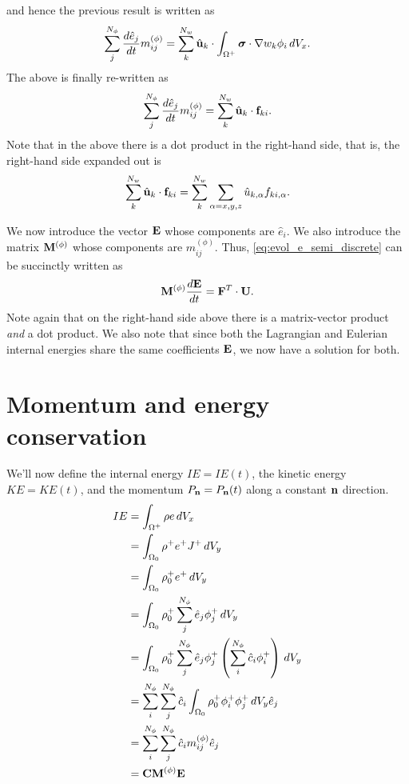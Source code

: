 \documentclass[11pt]{report}
\begin{document}
and hence the previous result is written as
\begin{equation}
    \sum_j^{N_\phi} \frac{d \hat{e}_j}{dt} m_{ij}^{(\phi)} = \sum_k^{N_w} \hat{\mathbf{u}}_k \cdot \int_{\Omega^+} \bm \sigma \cdot \nabla w_k \phi_i \, dV_x.
\end{equation}
The above is finally re-written as
\begin{equation}
    \label{eq:evol_e_semi_discrete}
    \sum_j^{N_\phi} \frac{d \hat{e}_j}{d t} m^{(\phi)}_{ij} = \sum_k^{N_w} \hat{\mathbf{u}}_k \cdot \mathbf{f}_{ki}.
\end{equation}
Note that in the above there is a dot product in the right-hand side, that is, the right-hand side expanded out is  
\begin{equation}
    \sum_k^{N_w} \hat{\mathbf{u}}_k \cdot \mathbf{f}_{ki} = \sum_k^{N_w} \sum_{\alpha=x,y,z} \hat{u}_{k,\alpha} f_{ki,\alpha}.
\end{equation}

We now introduce the vector $\mathbf{E}$ whose components are $\hat{e}_i$. We also introduce the matrix $\mathbf{M}^{(\phi)}$ whose components are $m_{ij}^{(\phi)}$. Thus, \cref{eq:evol_e_semi_discrete} can be succinctly written as
\begin{equation}
    \mathbf{M}^{(\phi)} \frac{d\mathbf{E}}{dt} = \mathbf{F}^T \cdot \mathbf{U}.
\end{equation}
Note again that on the right-hand side above there is a matrix-vector product \textit{and} a dot product. We also note that since both the Lagrangian and Eulerian internal energies share the same coefficients $\mathbf{E}$, we now have a solution for both.

\section{Momentum and energy conservation}
We'll now define the internal energy $IE=IE(t)$, the kinetic energy $KE=KE(t)$, and the momentum $P_{\mathbf{n}}=P_{\mathbf{n}}(t)$ along a constant $\mathbf{n}$ direction.
\begin{align}
    IE &= \int_{\Omega^+} \rho e \, dV_x \nonumber \\
    &= \int_{\Omega_0} \rho^+ e^+ J^+ \, dV_y \nonumber \\
    &= \int_{\Omega_0} \rho^+_0 e^+ \, dV_y \nonumber \\
    &= \int_{\Omega_0} \rho_0^+ \sum_{j}^{N_\phi} \hat{e}_j \phi_j^+ \, dV_y \nonumber \\
    &= \int_{\Omega_0} \rho_0^+ \sum_{j}^{N_\phi} \hat{e}_j \phi_j^+ \left ( \sum_{i}^{N_\phi} \hat{c}_i \phi^+_i \right ) \, dV_y \nonumber \\
    &= \sum_i^{N_\phi} \sum_j^{N_\phi} \hat{c}_i \int_{\Omega_0} \rho_0^+ \phi_i^+ \phi_j^+ \, dV_y \hat{e}_j \nonumber \\
    &= \sum_i^{N_\phi} \sum_j^{N_\phi} \hat{c}_i m_{ij}^{(\phi)} \hat{e}_j \nonumber \\
    &= \mathbf{C} \mathbf{M}^{(\phi)} \mathbf{E} 
\end{align}
\end{document}
